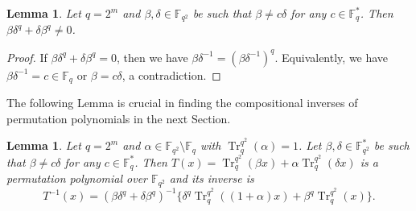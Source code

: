 \documentclass{birkjour}
\newtheorem{lem}[thm]{Lemma}
\theoremstyle{definition}
\theoremstyle{remark}
\numberwithin{equation}{section}
\begin{document}
	
	\begin{lem}\label{lem1}
		 Let $q=2^m$ and $\beta,\delta\in\mathbb{F}_{q^2}$ be such that $\beta\neq c\delta$ for any $c\in \mathbb{F}^{*}_q$. Then $\beta\delta^{q}+\delta\beta^{q}\neq0$.
	\end{lem}
	\begin{proof}
		If $\beta\delta^{q}+\delta\beta^{q}=0$, then we have
		$\beta\delta^{-1}={(\beta\delta^{-1})}^{q}$. Equivalently, we have $\beta\delta^{-1}=c\in\mathbb{F}_q$ or $\beta=c\delta$, a contradiction.
	\end{proof}
The following Lemma is crucial in finding the compositional inverses of permutation polynomials in the next Section.
	\begin{lem}\label{lem2}
		Let $q=2^m$ and $\alpha\in\mathbb{F}_{q^2}\setminus\mathbb{F}_q$ with $\operatorname{Tr}_q^{q^2}(\alpha)=1$.  Let $\beta, \delta \in \mathbb{F}^{*}_{q^2}$ be such that $\beta \neq c\delta$ for any $c \in \mathbb{F}^{*}_{q}$. 
		Then 
		$T(x)=\operatorname{Tr}_{q}^{q^2}(\beta x)+\alpha\operatorname{Tr}_{q}^{q^2}(\delta x)$ is a permutation polynomial over $\mathbb{F}_{q^2}$ and its inverse is
		$$T^{-1}(x)=(\beta\delta^{q}+\delta\beta^{q})^{-1}\{\delta^{q}\operatorname{Tr}_{q}^{q^2}((1+\alpha)x)+\beta^{q}\operatorname{Tr}_{q}^{q^2}(x)\}.$$
	\end{lem}
\end{document}

